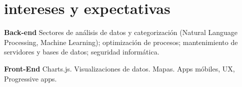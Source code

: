\documentclass[espanol]{cv-style}     %
\begin{document}
\section{intereses y expectativas}
  \vspace{-0.2cm}
\textbf{Back-end} Sectores de análisis de datos y categorización (Natural Language Processing, Machine Learning); optimización de procesos; mantenimiento de servidores y bases de datos; seguridad informática.

\textbf{Front-End} Charts.js. Visualizaciones de datos. Mapas. Apps móbiles, UX, Progressive apps.
\end{document}
